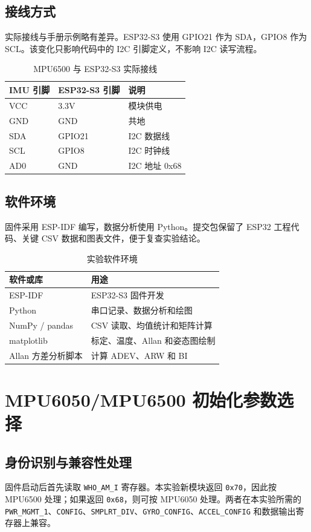 \documentclass[UTF8,a4paper,12pt]{ctexart}
\newcommand{\code}[1]{\texttt{#1}}
\begin{document}
\subsection{接线方式}
实际接线与手册示例略有差异。ESP32-S3 使用 GPIO21 作为 SDA，GPIO8 作为 SCL。该变化只影响代码中的 I2C 引脚定义，不影响 I2C 读写流程。

\begin{table}[H]
\centering
\caption{MPU6500 与 ESP32-S3 实际接线}
\begin{tabular}{lll}
\toprule
IMU 引脚 & ESP32-S3 引脚 & 说明\\
\midrule
VCC & 3.3V & 模块供电\\
GND & GND & 共地\\
SDA & GPIO21 & I2C 数据线\\
SCL & GPIO8 & I2C 时钟线\\
AD0 & GND & I2C 地址 0x68\\
\bottomrule
\end{tabular}
\end{table}

\subsection{软件环境}
固件采用 ESP-IDF 编写，数据分析使用 Python。提交包保留了 ESP32 工程代码、关键 CSV 数据和图表文件，便于复查实验结论。

\begin{table}[H]
\centering
\caption{实验软件环境}
\begin{tabular}{ll}
\toprule
软件或库 & 用途\\
\midrule
ESP-IDF & ESP32-S3 固件开发\\
Python & 串口记录、数据分析和绘图\\
NumPy / pandas & CSV 读取、均值统计和矩阵计算\\
matplotlib & 标定、温度、Allan 和姿态图绘制\\
Allan 方差分析脚本 & 计算 ADEV、ARW 和 BI\\
\bottomrule
\end{tabular}
\end{table}

\section{MPU6050/MPU6500 初始化参数选择}
\subsection{身份识别与兼容性处理}
固件启动后首先读取 \code{WHO\_AM\_I} 寄存器。本实验新模块返回 \code{0x70}，因此按 MPU6500 处理；如果返回 \code{0x68}，则可按 MPU6050 处理。两者在本实验所需的 \code{PWR\_MGMT\_1}、\code{CONFIG}、\code{SMPLRT\_DIV}、\code{GYRO\_CONFIG}、\code{ACCEL\_CONFIG} 和数据输出寄存器上兼容。
\end{document}
